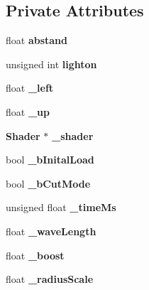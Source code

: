 \subsection*{Private Attributes}
\begin{DoxyCompactItemize}
\item 
float {\bfseries abstand}\label{classSoundfieldViewer_1_1MatlabFieldViewerSimple_ac3950f7621171f265b791a92fe32c044}

\item 
unsigned int {\bfseries lighton}\label{classSoundfieldViewer_1_1MatlabFieldViewerSimple_a29038a7fdf4e86839780059dc52d1e06}

\item 
float {\bfseries \-\_\-left}\label{classSoundfieldViewer_1_1MatlabFieldViewerSimple_a9113d01011f8c70bbaac45eab0c61acc}

\item 
float {\bfseries \-\_\-up}\label{classSoundfieldViewer_1_1MatlabFieldViewerSimple_a241fd364f6cc5880ced10acd7952b45d}

\item 
{\bf Shader} $\ast$ {\bfseries \-\_\-shader}\label{classSoundfieldViewer_1_1MatlabFieldViewerSimple_a2a6e3f25472a29cf75fcf681fb2aae52}

\item 
bool {\bfseries \-\_\-b\-Inital\-Load}\label{classSoundfieldViewer_1_1MatlabFieldViewerSimple_a0ee301b9aa56da94f9735ddb17f726f1}

\item 
bool {\bfseries \-\_\-b\-Cut\-Mode}\label{classSoundfieldViewer_1_1MatlabFieldViewerSimple_a54e828c2e056c4039796bc5c7f2b4f1e}

\item 
unsigned float {\bfseries \-\_\-time\-Ms}\label{classSoundfieldViewer_1_1MatlabFieldViewerSimple_a80c3f8fcb56886d3a71f6ed6b42034c4}

\item 
float {\bfseries \-\_\-wave\-Length}\label{classSoundfieldViewer_1_1MatlabFieldViewerSimple_a189eff903fc14b4c43f8bd68b97f2b06}

\item 
float {\bfseries \-\_\-boost}\label{classSoundfieldViewer_1_1MatlabFieldViewerSimple_ad6e7c57bfde59d11468a8a90f673a681}

\item 
float {\bfseries \-\_\-radius\-Scale}\label{classSoundfieldViewer_1_1MatlabFieldViewerSimple_aef79a947ab81d9fedea347e98ca4990d}


\end{DoxyCompactItemize}
